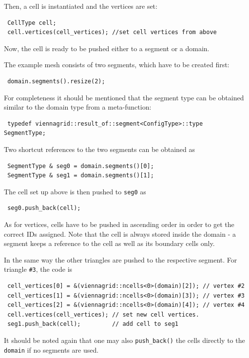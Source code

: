 
Then, a cell is instantiated and the vertices are set:
\begin{lstlisting}
 CellType cell;
 cell.vertices(cell_vertices); //set cell vertices from above
\end{lstlisting}
Now, the cell is ready to be pushed either to a segment or a domain. 

The example mesh consists of two segments, which have to be created first:
\begin{lstlisting}
 domain.segments().resize(2);
\end{lstlisting}
For completeness it should be mentioned that the segment type can be obtained similar to the domain type from a meta-function:
\begin{lstlisting}
 typedef viennagrid::result_of::segment<ConfigType>::type   SegmentType;
\end{lstlisting}
Two shortcut references to the two segments can be obtained as
\begin{lstlisting}
 SegmentType & seg0 = domain.segments()[0];
 SegmentType & seg1 = domain.segments()[1];
\end{lstlisting}
The cell set up above is then pushed to \lstinline|seg0| as
\begin{lstlisting}
 seg0.push_back(cell);
\end{lstlisting}
As for vertices, cells have to be pushed in ascending order in order to get the correct IDs assigned. Note that the cell is always stored inside the domain - a segment keeps a reference to the cell as well as its boundary cells only.

In the same way the other triangles are pushed to the respective segment. For triangle \lstinline|#3|, the code is
\begin{lstlisting}
 cell_vertices[0] = &(viennagrid::ncells<0>(domain)[2]); // vertex #2
 cell_vertices[1] = &(viennagrid::ncells<0>(domain)[3]); // vertex #3
 cell_vertices[2] = &(viennagrid::ncells<0>(domain)[4]); // vertex #4
 cell.vertices(cell_vertices); // set new cell vertices.
 seg1.push_back(cell);         // add cell to seg1
\end{lstlisting}
It should be noted again that one may also \lstinline|push_back()| the cells directly to the \lstinline|domain| if no segments are used.

